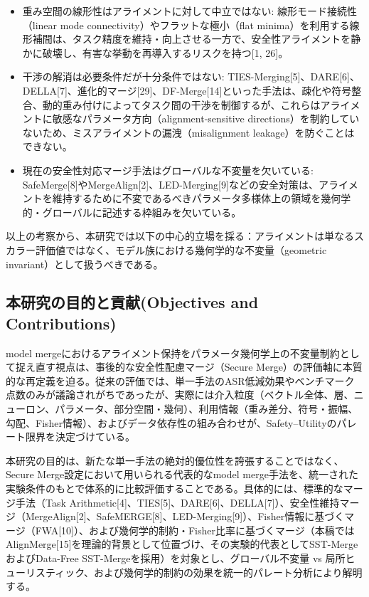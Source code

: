 \documentclass{article}
\begin{document}
\begin{itemize}
\item 重み空間の線形性はアライメントに対して中立ではない: 線形モード接続性（linear mode connectivity）やフラットな極小（flat minima）を利用する線形補間は、タスク精度を維持・向上させる一方で、安全性アライメントを静かに破壊し、有害な挙動を再導入するリスクを持つ[1, 26]。
\item 干渉の解消は必要条件だが十分条件ではない: TIES-Merging[5]、DARE[6]、DELLA[7]、進化的マージ[29]、DF-Merge[14]といった手法は、疎化や符号整合、動的重み付けによってタスク間の干渉を制御するが、これらはアライメントに敏感なパラメータ方向（alignment-sensitive directions）を制約していないため、ミスアライメントの漏洩（misalignment leakage）を防ぐことはできない。
\item 現在の安全性対応マージ手法はグローバルな不変量を欠いている: SafeMerge[8]やMergeAlign[2]、LED-Merging[9]などの安全対策は、アライメントを維持するために不変であるべきパラメータ多様体上の領域を幾何学的・グローバルに記述する枠組みを欠いている。
\end{itemize}

以上の考察から、本研究では以下の中心的立場を採る：アライメントは単なるスカラー評価値ではなく、モデル族における幾何学的な不変量（geometric invariant）として扱うべきである。


\subsection{本研究の目的と貢献(Objectives and Contributions)}

model mergeにおけるアライメント保持をパラメータ幾何学上の不変量制約として捉え直す視点は、事後的な安全性配慮マージ（Secure Merge）の評価軸に本質的な再定義を迫る。従来の評価では、単一手法のASR低減効果やベンチマーク点数のみが議論されがちであったが、実際には介入粒度（ベクトル全体、層、ニューロン、パラメータ、部分空間・幾何）、利用情報（重み差分、符号・振幅、勾配、Fisher情報）、およびデータ依存性の組み合わせが、Safety--Utilityのパレート限界を決定づけている。

本研究の目的は、新たな単一手法の絶対的優位性を誇張することではなく、Secure Merge設定において用いられる代表的なmodel merge手法を、統一された実験条件のもとで体系的に比較評価することである。具体的には、標準的なマージ手法（Task Arithmetic[4]、TIES[5]、DARE[6]、DELLA[7]）、安全性維持マージ（MergeAlign[2]、SafeMERGE[8]、LED-Merging[9]）、Fisher情報に基づくマージ（FWA[10]）、および幾何学的制約・Fisher比率に基づくマージ（本稿ではAlignMerge[15]を理論的背景として位置づけ、その実験的代表としてSST-MergeおよびData-Free SST-Mergeを採用）を対象とし、グローバル不変量 vs 局所ヒューリスティック、および幾何学的制約の効果を統一的パレート分析により解明する。
\end{document}
